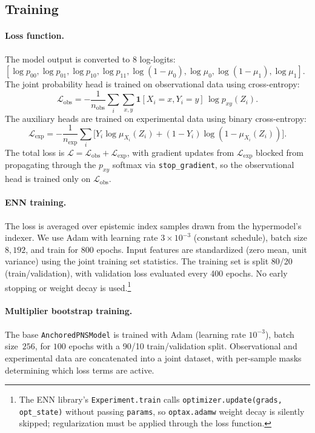 \documentclass[accepted]{uai2026} %
\theoremstyle{plain}
\theoremstyle{definition}
\theoremstyle{remark}
\begin{document}
\subsection{Training}
\label{app:training}

\paragraph{Loss function.}
The model output is converted to 8 log-logits:
$[\log p_{00}, \log p_{01}, \log p_{10},
  \log p_{11},
  \log(1{-}\mu_0), \log \mu_0,
  \log(1{-}\mu_1), \log \mu_1]$.
The joint probability head is trained on
observational data using cross-entropy:
\[
  \mathcal{L}_{\mathrm{obs}}
  = -\frac{1}{n_{\mathrm{obs}}}
    \sum_{i}
    \sum_{x,y}
    \mathbf{1}[X_i {=} x, Y_i {=} y]
    \,\log p_{xy}(Z_i).
\]
The auxiliary heads are trained on experimental
data using binary cross-entropy:
\[
  \mathcal{L}_{\mathrm{exp}}
  = -\frac{1}{n_{\mathrm{exp}}}
    \sum_{i}
    \bigl[
      Y_i \log \mu_{X_i}(Z_i)
      + (1{-}Y_i) \log(1{-}\mu_{X_i}(Z_i))
    \bigr].
\]
The total loss is
$\mathcal{L} = \mathcal{L}_{\mathrm{obs}}
  + \mathcal{L}_{\mathrm{exp}}$,
with gradient updates from
$\mathcal{L}_{\mathrm{exp}}$ blocked from
propagating through the $p_{xy}$ softmax via
\texttt{stop\_gradient}, so the observational
head is trained only on
$\mathcal{L}_{\mathrm{obs}}$.

\paragraph{ENN training.}
The loss is averaged over epistemic index
samples drawn from the hypermodel's indexer.
We use Adam with learning rate
$3 \times 10^{-3}$ (constant schedule), batch
size $8{,}192$, and train for $800$ epochs.
Input features are standardized (zero mean, unit
variance) using the joint training set
statistics.  The training set is split 80/20
(train/validation), with validation loss
evaluated every 400 epochs.  No early stopping
or weight decay is used.\footnote{%
  The ENN library's \texttt{Experiment.train}
  calls \texttt{optimizer.update(grads,
  opt\_state)} without passing \texttt{params},
  so \texttt{optax.adamw} weight decay is
  silently skipped; regularization must be
  applied through the loss function.}

\paragraph{Multiplier bootstrap training.}
The base \texttt{AnchoredPNSModel} is trained
with Adam (learning rate $10^{-3}$), batch
size~$256$, for $100$ epochs with a 90/10
train/validation split.  Observational and
experimental data are concatenated into a joint
dataset, with per-sample masks determining
which loss terms are active.
\end{document}
